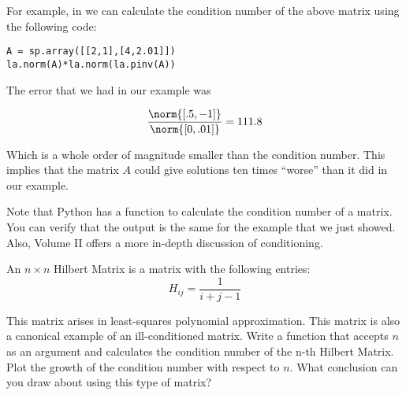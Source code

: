 For example, in \ProgrammingLanguage we can calculate the condition number of the above matrix using the following code:


\begin{lstlisting}[style=python]
A = sp.array([[2,1],[4,2.01]])
la.norm(A)*la.norm(la.pinv(A))
\end{lstlisting}

The error that we had in our example was

\[
\frac{\norm{[.5, -1]}}{\norm{[0, .01]}} = 111.8
\]

Which is a whole order of magnitude smaller than the condition number. This implies that the matrix $A$ could give solutions ten times ``worse'' than it did in our example.

Note that Python has a  function to calculate the condition number of a matrix. You can verify that the output is the same for the example that we just showed. Also, Volume II offers a more in-depth discussion of conditioning.

\begin{problem}
An $n \times n$ Hilbert Matrix is a matrix with the following entries:
\[
H_{ij} = \frac{1}{i + j -1}
\]

This matrix arises in least-squares polynomial approximation. This matrix is also a canonical example of an ill-conditioned matrix. Write a function that accepts $n$ as an argument and calculates the condition number of the n-th Hilbert Matrix. Plot the growth of the condition number with respect to $n$. What conclusion can you draw about using this type of matrix? %
\end{problem}